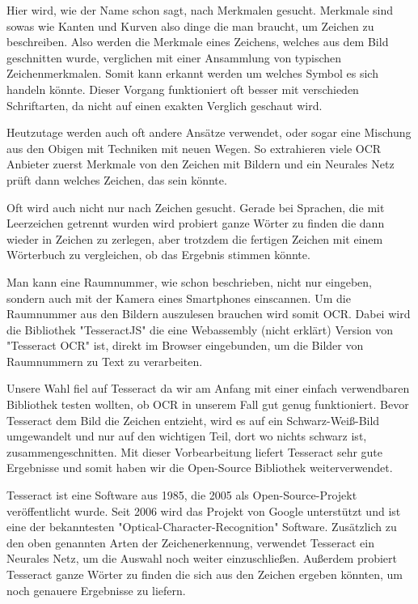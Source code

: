 
Hier wird, wie der Name schon sagt, nach Merkmalen gesucht. Merkmale sind sowas wie Kanten und Kurven also dinge die man braucht, um Zeichen zu beschreiben. Also werden die Merkmale eines Zeichens, welches aus dem Bild geschnitten wurde, verglichen mit einer Ansammlung von typischen Zeichenmerkmalen. Somit kann erkannt werden um welches Symbol es sich handeln könnte. Dieser Vorgang funktioniert oft besser mit verschieden Schriftarten, da nicht auf einen exakten Verglich geschaut wird.

Heutzutage werden auch oft andere Ansätze verwendet, oder sogar eine Mischung aus den Obigen mit Techniken mit neuen Wegen. So extrahieren viele OCR Anbieter zuerst Merkmale von den Zeichen mit Bildern und ein Neurales Netz prüft dann welches Zeichen, das sein könnte.

Oft wird auch nicht nur nach Zeichen gesucht. Gerade bei Sprachen, die mit Leerzeichen getrennt wurden wird probiert ganze Wörter zu finden die dann wieder in Zeichen zu zerlegen, aber trotzdem die fertigen Zeichen mit einem Wörterbuch zu vergleichen, ob das Ergebnis stimmen könnte.



Man kann eine Raumnummer, wie schon beschrieben, nicht nur eingeben, sondern auch mit der Kamera eines Smartphones einscannen. Um die Raumnummer aus den Bildern auszulesen brauchen wird somit OCR. Dabei wird die Bibliothek "TesseractJS" die eine Webassembly (nicht erklärt) Version von "Tesseract OCR" ist, direkt im Browser eingebunden, um die Bilder von Raumnummern zu Text zu verarbeiten.

Unsere Wahl fiel auf Tesseract da wir am Anfang mit einer einfach verwendbaren Bibliothek testen wollten, ob OCR in unserem Fall gut genug funktioniert. Bevor Tesseract dem Bild die Zeichen entzieht, wird es auf ein Schwarz-Weiß-Bild umgewandelt und nur auf den wichtigen Teil, dort wo nichts schwarz ist, zusammengeschnitten. Mit dieser Vorbearbeitung liefert Tesseract sehr gute Ergebnisse und somit haben wir die Open-Source Bibliothek weiterverwendet.


Tesseract ist eine Software aus 1985, die 2005 als Open-Source-Projekt veröffentlicht wurde. Seit 2006 wird das Projekt von Google unterstützt und ist eine der bekanntesten "Optical-Character-Recognition" Software. Zusätzlich zu den oben genannten Arten der Zeichenerkennung, verwendet Tesseract ein Neurales Netz, um die Auswahl noch weiter einzuschließen. Außerdem probiert Tesseract ganze Wörter zu finden die sich aus den Zeichen ergeben könnten, um noch genauere Ergebnisse zu liefern.\cite{OCRIntro}